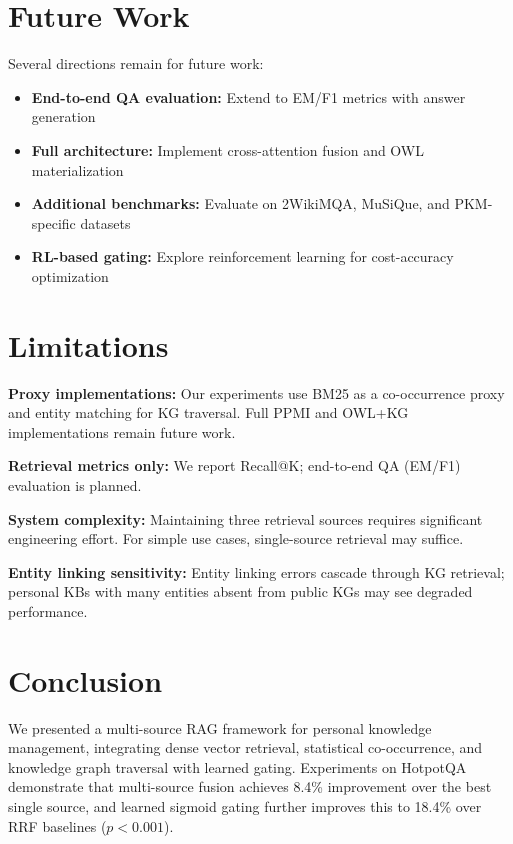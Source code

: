 \documentclass[11pt,a4paper]{article}
\begin{document}
\section{Future Work}
\label{sec:future}

Several directions remain for future work:
\begin{itemize}
    \item \textbf{End-to-end QA evaluation:} Extend to EM/F1 metrics with answer generation
    \item \textbf{Full architecture:} Implement cross-attention fusion and OWL materialization
    \item \textbf{Additional benchmarks:} Evaluate on 2WikiMQA, MuSiQue, and PKM-specific datasets
    \item \textbf{RL-based gating:} Explore reinforcement learning for cost-accuracy optimization
\end{itemize}

\section{Limitations}
\label{sec:limitations}

\textbf{Proxy implementations:} Our experiments use BM25 as a co-occurrence proxy and entity matching for KG traversal. Full PPMI and OWL+KG implementations remain future work.

\textbf{Retrieval metrics only:} We report Recall@K; end-to-end QA (EM/F1) evaluation is planned.

\textbf{System complexity:} Maintaining three retrieval sources requires significant engineering effort. For simple use cases, single-source retrieval may suffice.

\textbf{Entity linking sensitivity:} Entity linking errors cascade through KG retrieval; personal KBs with many entities absent from public KGs may see degraded performance.

\section{Conclusion}
\label{sec:conclusion}

We presented a multi-source RAG framework for personal knowledge management, integrating dense vector retrieval, statistical co-occurrence, and knowledge graph traversal with learned gating. Experiments on HotpotQA demonstrate that multi-source fusion achieves 8.4\% improvement over the best single source, and learned sigmoid gating further improves this to 18.4\% over RRF baselines ($p<0.001$).
\end{document}
